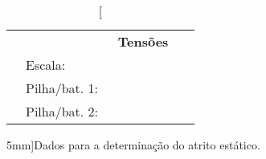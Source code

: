 \begin{table*}[!ht]
\centering
\begin{tabular}{lp{20mm}p{20mm}p{20mm}p{20mm}p{20mm}p{20mm}p{20mm}l}
\toprule
    & & \multicolumn{6}{c}{\textbf{Tensões}} \\
    \cmidrule{3-8}
    & Escala: & \cellcolor[gray]{0.89} & \cellcolor[gray]{0.92} & \cellcolor[gray]{0.89} & \cellcolor[gray]{0.92} & \cellcolor[gray]{0.89} & \cellcolor[gray]{0.92} & \\
    & Pilha/bat. 1: & \cellcolor[gray]{0.95} & \cellcolor[gray]{0.97} & \cellcolor[gray]{0.95} & \cellcolor[gray]{0.97} & \cellcolor[gray]{0.95} & \cellcolor[gray]{0.97}  \\
    & Pilha/bat. 2: & \cellcolor[gray]{0.89} & \cellcolor[gray]{0.92} & \cellcolor[gray]{0.89} & \cellcolor[gray]{0.92} & \cellcolor[gray]{0.89} & \cellcolor[gray]{0.92} \\
\bottomrule
\end{tabular}
\caption[][5mm]{Dados para a determinação do atrito estático.}
\label{Tab:TensaoPilha}
\end{table*}
